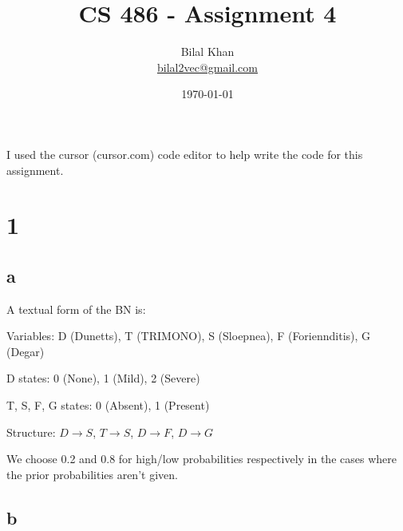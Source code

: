 \documentclass[11pt]{article}
\title{CS 486 - Assignment 4}
\author{Bilal Khan\\
\href{mailto:bilal2vec@gmail.com}{bilal2vec@gmail.com}}
\date{\today}
\begin{document}
\maketitle
\tableofcontents

I used the cursor (cursor.com) code editor to help write the code for this assignment.

\section{1}

\subsection{a}

A textual form of the BN is:

Variables: D (Dunetts), T (TRIMONO), S (Sloepnea), F (Foriennditis), G (Degar)

D states: 0 (None), 1 (Mild), 2 (Severe)

T, S, F, G states: 0 (Absent), 1 (Present)

Structure: $D \rightarrow S$, $T \rightarrow S$, $D \rightarrow F$, $D \rightarrow G$

We choose 0.2 and 0.8 for high/low probabilities respectively in the cases where the prior probabilities aren't given.

\subsection{b}
\end{document}
